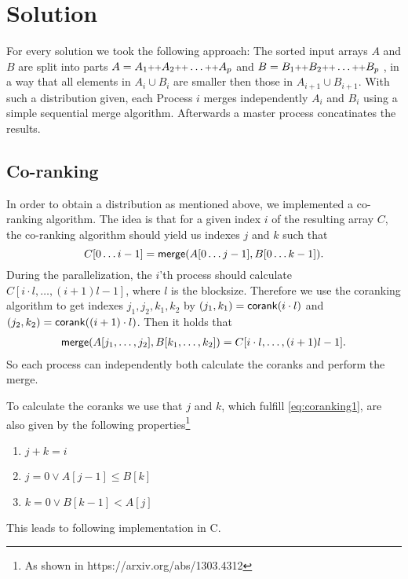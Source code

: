 \section{Solution}

For every solution we took the following approach:
The sorted input arrays $A$ and $B$ are split into parts
$A = A_1 \concat A_2 \concat \ldots \concat A_p$  and
$B = B_1 \concat B_2 \concat \ldots \concat B_p$
, in a way that all elements in $A_i \cup B_i$ are smaller then those in $A_{i+1} \cup B_{i+1}$. 
With such a distribution given, each Process $i$ merges independently $A_i$ and $B_i$ using a simple sequential merge algorithm.
Afterwards a master process concatinates the results.

\subsection{Co-ranking}
In order to obtain a distribution as mentioned above, we implemented a co-ranking algorithm.
The idea is that for a given index $i$ of the resulting array $C$, 
the co-ranking algorithm should yield us indexes $j$ and $k$
such that
\begin{equation}\label{eq:coranking1}
  C[0\ldots i-1] = \merge(A[0\ldots j-1],B[0\ldots k-1]).
\end{equation}
During the parallelization, the $i$'th process should calculate $C[i \cdot l, \ldots, (i+1) l - 1]$,
where $l$ is the blocksize.
Therefore we use the coranking algorithm to get indexes $j_1, j_2, k_1, k_2$ by
$(j_1,k_1) = \corank(i\cdot l)$ and $(j_2,k_2) = \corank((i+1)\cdot l)$.
Then it holds that
\begin{align*}
  \merge(A[j_1,\ldots,j_2],B[k_1,\ldots,k_2]) = C[i \cdot l,\ldots, (i+1)l - 1].
\end{align*}
So each process can independently both calculate the coranks and perform the merge.

To calculate the coranks we use that
$j$ and $k$, which fulfill \eqref{eq:coranking1}, are also given by the following
properties\footnote{As shown in https://arxiv.org/abs/1303.4312}
\begin{enumerate}
  \item $j + k = i$
  \item $j = 0 \vee A[j-1] \leq B[k]$
  \item $k = 0 \vee B[k-1] < A[j]$
\end{enumerate}
This leads to following implementation in C.



